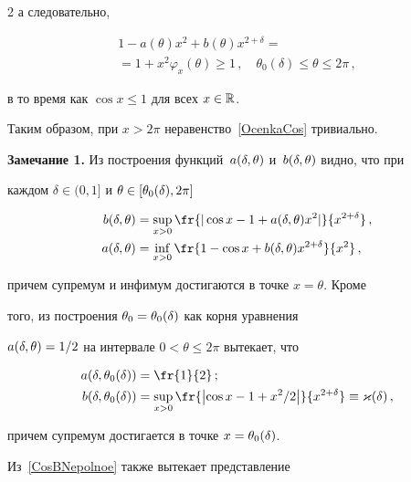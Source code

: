 \begin{multicols}{2}
а следовательно,

\begin{multline*}

1-a(\theta)x^2+b(\theta)x^{2+\delta}={}\\

{}=

1+x^2\varphi_x(\theta)\ge 1\,,\quad \theta_0(\delta)\le\theta\le2\pi\,,

\end{multline*}

в то время как $\cos x\le1$ для всех $x\in\mathbb R$.

Таким образом, при $x>2\pi$ неравенство~\eqref{OcenkaCos} тривиально.



\medskip



\noindent

\textbf{Замечание 1.} Из построения функций~$a(\delta,\theta)$ и~$b(\delta,\theta)$ видно, что при

каждом ${\delta\in(0,1]}$ и ${\theta\in[\theta_0(\delta),2\pi]}$

\begin{align*}

b(\d,\theta)&=\sup_{x>0}\fr{|\cos x-1+a(\d,\theta)x^2|}{x^{2+\d}}\,,\\

a(\d,\theta)&=\inf_{x>0}\fr{1-\cos x+b(\d,\theta)x^{2+\d}}{x^2}\,,

\end{align*}

причем супремум и инфимум достигаются в точке $x=\theta$. Кроме

того, из построения  $\theta_0=\theta_0(\delta)$ как корня уравнения

$a(\delta,\theta)=1/2$ на интервале $0<\theta\le 2\pi$ вытекает, что

\begin{align*}

a(\d,\theta_0(\d))&=\fr{1}{2}\,;\\

b(\d,\theta_0(\d))&=\sup_{x>0}\fr{\left|\cos

x-1+x^2/2\right|}{x^{2+\d}}\equiv \varkappa(\d)\,,

\end{align*}

причем супремум достигается в точке $x=\theta_0(\delta)$.

Из~\eqref{CosBNepolnoe} также вытекает представление

$$


\end{multicols}
